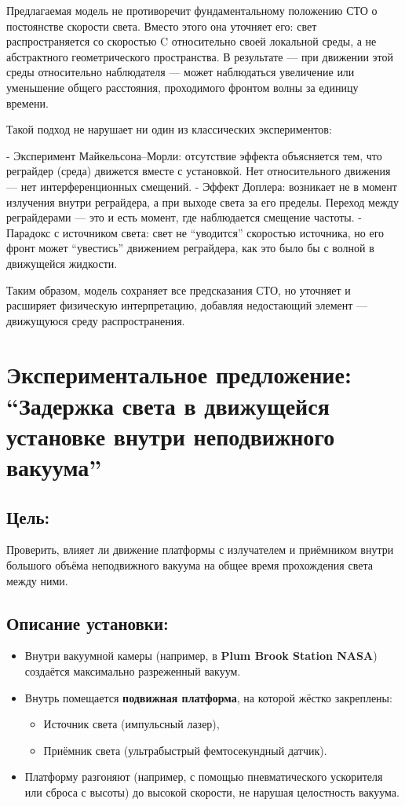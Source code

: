\documentclass[12pt]{article}
\begin{document}
Предлагаемая модель не противоречит фундаментальному положению СТО о постоянстве скорости света. Вместо этого она уточняет его: свет распространяется со скоростью C относительно своей локальной среды, а не абстрактного геометрического пространства. В результате — при движении этой среды относительно наблюдателя — может наблюдаться увеличение или уменьшение общего расстояния, проходимого фронтом волны за единицу времени.

Такой подход не нарушает ни один из классических экспериментов:

- Эксперимент Майкельсона–Морли: отсутствие эффекта объясняется тем, что реграйдер (среда) движется вместе с установкой. Нет относительного движения — нет интерференционных смещений.
- Эффект Доплера: возникает не в момент излучения внутри реграйдера, а при выходе света за его пределы. Переход между реграйдерами — это и есть момент, где наблюдается смещение частоты.
- Парадокс с источником света: свет не “уводится” скоростью источника, но его фронт может “увестись” движением реграйдера, как это было бы с волной в движущейся жидкости.

Таким образом, модель сохраняет все предсказания СТО, но уточняет и расширяет физическую интерпретацию, добавляя недостающий элемент — движущуюся среду распространения.

\section*{Экспериментальное предложение: “Задержка света в движущейся установке внутри неподвижного вакуума”}

\subsection*{Цель:}
Проверить, влияет ли движение платформы с излучателем и приёмником внутри большого объёма неподвижного вакуума на общее время прохождения света между ними.

\subsection*{Описание установки:}
\begin{itemize}
    \item Внутри вакуумной камеры (например, в \textbf{Plum Brook Station NASA}) создаётся максимально разреженный вакуум.
    \item Внутрь помещается \textbf{подвижная платформа}, на которой жёстко закреплены:
    \begin{itemize}
        \item Источник света (импульсный лазер),
        \item Приёмник света (ультрабыстрый фемтосекундный датчик).
    \end{itemize}
    \item Платформу разгоняют (например, с помощью пневматического ускорителя или сброса с высоты) до высокой скорости, не нарушая целостность вакуума.
\end{itemize}
\end{document}
